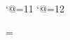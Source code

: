 



\catcode`@=11
\def\makedigitsother{\m@kedigitsother}
\def\makedigitsletters{\m@kedigitsletters}
\catcode `@=12

\def\nbsp{ }    %
\def\zwsp{​}     %
\def\zwj{‍}      %

\newdimen\remblskip \remblskip=\baselineskip
\def\suckupline{\vskip -\baselineskip}          %
\def\suckuphalfline{\vskip -0.5\baselineskip}   %
\def\suckupqline{\vskip -0.25\baselineskip}     %
\def\skipline{\vskip\baselineskip}              %
\def\skiphalfline{\vskip 0.5\baselineskip}      %
\def\skipqline{\vskip 0.25\baselineskip}        %


